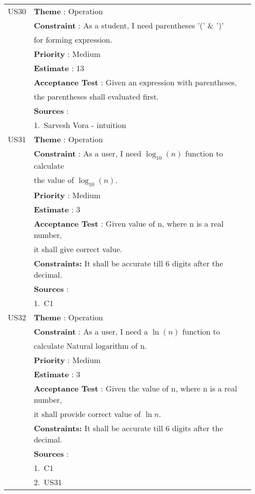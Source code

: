 \documentclass{article}
\begin{document}
\begin{longtable}{|| c || l ||}
         \hline
         US30 & \textbf{Theme} : Operation \\
         & \textbf{Constraint} : As a student, I need parentheses '(' \& ')' \\
         & for forming expression.\\
         & \textbf{Priority} : Medium \\
         & \textbf{Estimate} : 13 \\
         & \textbf{Acceptance Test} : Given an expression with parentheses, \\
         & the parentheses shall evaluated first.\\
         & \textbf{Sources} : \\
         & 1.~Sarvesh Vora - intuition\\
         \hline
         US31 & \textbf{Theme} : Operation \\
         & \textbf{Constraint} : As a user, I need $\log_{10}(n)$ function to calculate\\
         & the value of $\log_{10}(n)$.\\
         & \textbf{Priority} : Medium \\
         & \textbf{Estimate} : 3 \\
         & \textbf{Acceptance Test} : Given value of n, where n is a real number,\\
         & it shall give correct value.\\
         & \textbf{Constraints: } It shall be accurate till 6 digits after the decimal.\\
         & \textbf{Sources} : \\
         & 1.~C1\\
         \hline
         US32 & \textbf{Theme} : Operation \\
         & \textbf{Constraint} : As a user, I need a $\ln(n)$ function to \\
         & calculate Natural logarithm of n.\\
         & \textbf{Priority} : Medium \\
         & \textbf{Estimate} : 3 \\
         & \textbf{Acceptance Test} : Given the value of n, where n is a real number, \\
         & it shall provide correct value of $\ln{n}$.\\
         & \textbf{Constraints: } It shall be accurate till 6 digits after the decimal.\\
         & \textbf{Sources} : \\
         & 1.~C1\\
         & 2.~US31 \\
         \hline
         \hline
\end{longtable}
\newpage
\end{document}
